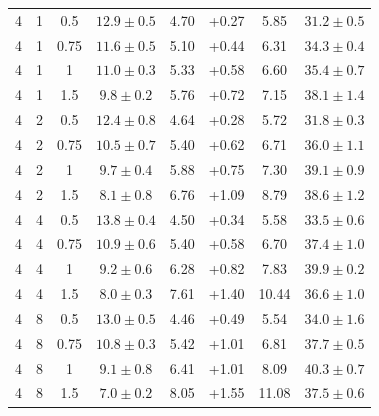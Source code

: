 \documentclass{article}
\begin{document}
\begin{table}[!htbp]
\begin{tabular}{cccccccc}
4 & 1 & 0.5 & $12.9\pm0.5$ & 4.70 & +0.27 & 5.85 & $31.2\pm0.5$\\
4 & 1 & 0.75 & $11.6\pm0.5$ & 5.10 & +0.44 & 6.31 & $34.3\pm0.4$\\
4 & 1 & 1 & $11.0\pm0.3$ & 5.33 & +0.58 & 6.60 & $35.4\pm0.7$\\
4 & 1 & 1.5 & $9.8\pm0.2$ & 5.76 & +0.72 & 7.15 & $38.1\pm1.4$\\
4 & 2 & 0.5 & $12.4\pm0.8$ & 4.64 & +0.28 & 5.72 & $31.8\pm0.3$\\
4 & 2 & 0.75 & $10.5\pm0.7$ & 5.40 & +0.62 & 6.71 & $36.0\pm1.1$\\
4 & 2 & 1 & $9.7\pm0.4$ & 5.88 & +0.75 & 7.30 & $39.1\pm0.9$\\
4 & 2 & 1.5 & $8.1\pm0.8$ & 6.76 & +1.09 & 8.79 & $38.6\pm1.2$\\
4 & 4 & 0.5 & $13.8\pm0.4$ & 4.50 & +0.34 & 5.58 & $33.5\pm0.6$\\
4 & 4 & 0.75 & $10.9\pm0.6$ & 5.40 & +0.58 & 6.70 & $37.4\pm1.0$\\
4 & 4 & 1 & $9.2\pm0.6$ & 6.28 & +0.82 & 7.83 & $39.9\pm0.2$\\
4 & 4 & 1.5 & $8.0\pm0.3$ & 7.61 & +1.40 & 10.44 & $36.6\pm1.0$\\
4 & 8 & 0.5 & $13.0\pm0.5$ & 4.46 & +0.49 & 5.54 & $34.0\pm1.6$\\
4 & 8 & 0.75 & $10.8\pm0.3$ & 5.42 & +1.01 & 6.81 & $37.7\pm0.5$\\
4 & 8 & 1 & $9.1\pm0.8$ & 6.41 & +1.01 & 8.09 & $40.3\pm0.7$\\
4 & 8 & 1.5 & $7.0\pm0.2$ & 8.05 & +1.55 & 11.08 & $37.5\pm0.6$\\
\bottomrule
\end{tabular}
\end{table}
\clearpage
\end{document}
